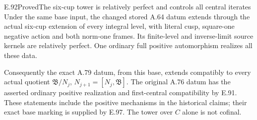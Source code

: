 \begin{result}{E.92}{Proved}{The six-cup tower is relatively perfect and controls all central iterates}
Under the same base input, the changed stored A.64 datum extends
through the actual six-cup extension of every integral level,
with literal cusp, square-one negative action and both norm-one
frames.  Its finite-level and inverse-limit source kernels are
relatively perfect.  One ordinary full positive automorphism
realizes all these data.

Consequently the exact A.79 datum, from this base, extends
compatibly to every actual quotient
\(\mathfrak B/N_j\), \(N_{j+1}=[N_j,\mathfrak B]\).
The original A.76 datum has the asserted ordinary positive
realization and first-central compatibility by E.91.
These statements include the positive mechanisms in the historical
claims; their exact base marking is supplied by E.97.
The tower over \(C\) alone is not cofinal.
\end{result}
